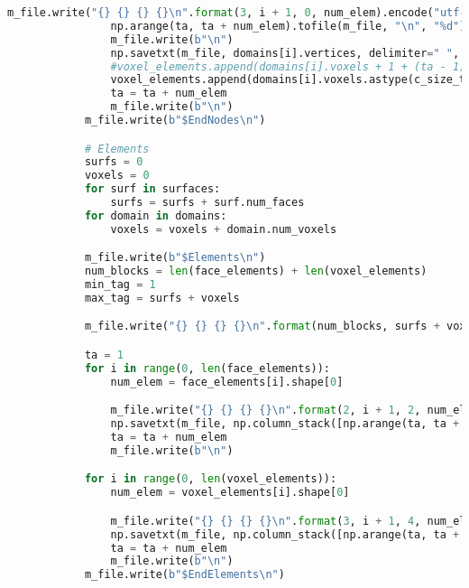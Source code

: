 \begin{lstlisting}[language=Python,caption={Class defining parsers and writers for commonly used file types. Here .gmsh and .poly are covered.},captionpos=b,label=lst:file_ops_class]
                m_file.write("{} {} {} {}\n".format(3, i + 1, 0, num_elem).encode("utf-8"))
                np.arange(ta, ta + num_elem).tofile(m_file, "\n", "%d")
                m_file.write(b"\n")
                np.savetxt(m_file, domains[i].vertices, delimiter=" ", fmt="%" + float_fmt)
                #voxel_elements.append(domains[i].voxels + 1 + (ta - 1))
                voxel_elements.append(domains[i].voxels.astype(c_size_t) + 1 + (ta - 1))
                ta = ta + num_elem
                m_file.write(b"\n")
            m_file.write(b"$EndNodes\n")

            # Elements
            surfs = 0
            voxels = 0
            for surf in surfaces:
                surfs = surfs + surf.num_faces
            for domain in domains:
                voxels = voxels + domain.num_voxels

            m_file.write(b"$Elements\n")
            num_blocks = len(face_elements) + len(voxel_elements)
            min_tag = 1
            max_tag = surfs + voxels

            m_file.write("{} {} {} {}\n".format(num_blocks, surfs + voxels, min_tag, max_tag).encode("utf-8"))

            ta = 1
            for i in range(0, len(face_elements)):
                num_elem = face_elements[i].shape[0]

                m_file.write("{} {} {} {}\n".format(2, i + 1, 2, num_elem).encode("utf-8"))
                np.savetxt(m_file, np.column_stack([np.arange(ta, ta + num_elem), face_elements[i]]), "%d", " ")
                ta = ta + num_elem
                m_file.write(b"\n")

            for i in range(0, len(voxel_elements)):
                num_elem = voxel_elements[i].shape[0]

                m_file.write("{} {} {} {}\n".format(3, i + 1, 4, num_elem).encode("utf-8"))
                np.savetxt(m_file, np.column_stack([np.arange(ta, ta + num_elem), voxel_elements[i]]), "%d", " ")
                ta = ta + num_elem
                m_file.write(b"\n")
            m_file.write(b"$EndElements\n")
\end{lstlisting}

